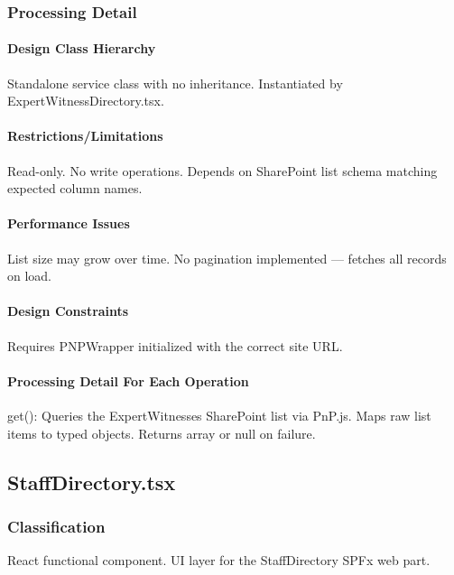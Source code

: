 \documentclass[12pt]{article}
\begin{document}
\subsubsection{Processing Detail}

\paragraph{Design Class Hierarchy}

Standalone service class with no inheritance. Instantiated by ExpertWitnessDirectory.tsx.

\paragraph{Restrictions/Limitations}

Read-only. No write operations. Depends on SharePoint list schema matching expected column names.

\paragraph{Performance Issues}

List size may grow over time. No pagination implemented --- fetches all records on load.

\paragraph{Design Constraints}

Requires PNPWrapper initialized with the correct site URL.

\paragraph{Processing Detail For Each Operation}

get(): Queries the ExpertWitnesses SharePoint list via PnP.js. Maps raw list items to typed objects. Returns array or null on failure.

\subsection{StaffDirectory.tsx}

\subsubsection{Classification}

React functional component. UI layer for the StaffDirectory SPFx web part.
\end{document}
